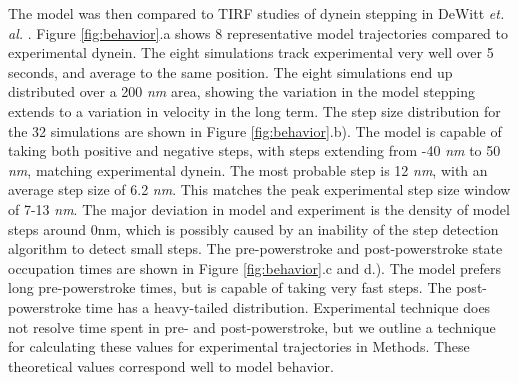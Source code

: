 \documentclass[9pt,twocolumn,twoside]{pnas-new}
\begin{document}
The model was then compared to TIRF studies of dynein stepping in DeWitt \textit{et. al.} \cite{yildizpaper}. Figure \ref{fig:behavior}.a shows 8 representative model trajectories compared to experimental dynein. The eight simulations track experimental very well over 5 seconds, and average to the same position. The eight simulations end up distributed over a 200 \textit{nm} area, showing the variation in the model stepping extends to a variation in velocity in the long term. The step size distribution for the 32 simulations are shown in Figure \ref{fig:behavior}.b). The model is capable of taking both positive and negative steps, with steps extending from -40 \textit{nm} to 50 \textit{nm}, matching experimental dynein. The most probable step is 12 \textit{nm}, with an average step size of 6.2 \textit{nm}. This matches the peak experimental step size window of 7-13 \textit{nm}. The major deviation in model and experiment is the density of model steps around 0nm, which is possibly caused by an inability of the step detection algorithm to detect small steps. The pre-powerstroke and post-powerstroke state occupation times are shown in Figure \ref{fig:behavior}.c and d.). The model prefers long pre-powerstroke times, but is capable of taking very fast steps. The post-powerstroke time has a heavy-tailed distribution. Experimental technique does not resolve time spent in pre- and post-powerstroke, but we outline a technique for calculating these values for experimental trajectories in Methods. These theoretical values correspond well to model behavior.\\
\end{document}
